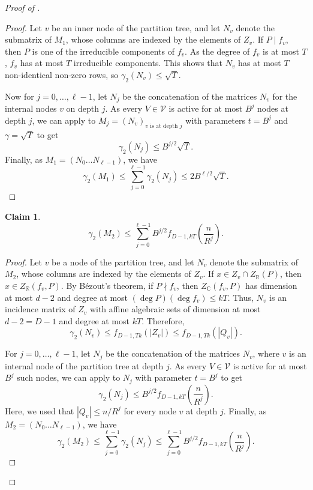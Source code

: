 \documentclass[10pt,a4paper]{amsart}
\newtheorem{claim}{Claim}
\begin{document}
\begin{proof}[Proof of ]
		\begin{proof}
			Let $v$ be an inner node of the partition tree, and let $N_v$ denote the submatrix of $M_1$, whose columns are indexed by the elements of $Z_v$. If $P\mid f_v$, then $P$ is one of the irreducible components of $f_v$. As the degree of $f_v$ is at most $T$, $f_v$ has at most $T$ irreducible components. This shows that $N_v$ has at most $T$ non-identical non-zero rows, so $\gamma_2(N_v)\leq \sqrt{T}$.
			
			Now for $j=0,\dots,\ell-1$, let $N_{j}$ be the concatenation of the matrices $N_v$ for the internal nodes $v$ on depth $j$. As every $V\in \mathcal{V}$ is active for at most $B^j$ nodes at depth $j$, we can apply  to $M_j=(N_v)_{v\text{ is at depth }j}$ with parameters $t=B^j$ and $\gamma=\sqrt{T}$ to get
			$$\gamma_2(N_j)\leq B^{j/2}\sqrt{T}.$$
			Finally, as $M_1=(N_0\dots N_{\ell-1})$, we have
			$$\gamma_2(M_1)\leq \sum_{j=0}^{\ell-1}\gamma_2(N_j)\leq 2 B^{\ell/2}\sqrt{T}.$$
		\end{proof}
		
		\begin{claim}
			$$\gamma_2(M_2)\leq \sum_{j=0}^{\ell-1}B^{j/2}f_{D-1,kT}\left(\frac{n}{R^j}\right).$$
		\end{claim}
		\begin{proof}
			Let $v$ be a node of the partition tree, and let $N_v$ denote the submatrix of $M_2$, whose columns are indexed by the elements of $Z_v$. If $x\in Z_v\cap Z_{\mathbb{R}}(P)$, then $x\in Z_{\mathbb{R}}(f_v,P)$. By B\'ezout's theorem, if $P\nmid f_v$, then $Z_{\mathbb{C}}(f_v,P)$ has dimension at most $d-2$ and degree at most $(\deg P)(\deg f_v)\leq kT$. Thus, $N_v$ is an incidence matrix of $Z_v$ with affine algebraic sets of dimension at most $d-2=D-1$ and  degree at most $kT$. Therefore,
			$$\gamma_2(N_v)\leq f_{D-1,Tk}(|Z_v|)\leq f_{D-1,Tk}(|Q_v|).$$
			
			For $j=0,\dots,\ell-1$, let $N_{j}$ be the concatenation of the matrices $N_v$, where $v$ is an internal node of the partition tree at depth $j$. As every $V\in \mathcal{V}$ is active for at most $B^j$ such nodes, we can apply  to $N_j$ with parameter $t=B^j$ to get
			$$\gamma_2(N_j)\leq B^{j/2}f_{D-1,kT}\left(\frac{n}{R^j}\right).$$
			Here, we used that $|Q_v|\leq n/R^j$ for every node $v$ at depth $j$.
			Finally, as $M_2=(N_0\dots N_{\ell-1})$, we have
			$$\gamma_2(M_2)\leq \sum_{j=0}^{\ell-1}\gamma_2(N_j)\leq \sum_{j=0}^{\ell-1}B^{j/2}f_{D-1,kT}\left(\frac{n}{R^j}\right).$$
		\end{proof}
		

\end{proof}
\end{document}
